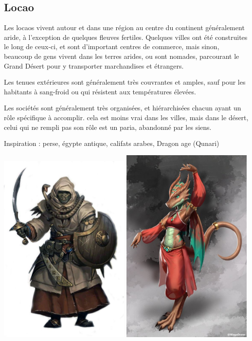\documentclass[10pt,a4paper]{book}
\begin{document}
\subsection{Locao}
Les locaos vivent autour et dans une région au centre du continent généralement aride, à l'exception de quelques fleuves fertiles. Quelques villes ont été construites le long de ceux-ci, et sont d'important centres de commerce, mais sinon, beaucoup de gens vivent dans les terres arides, ou sont nomades, parcourant le Grand Désert pour y transporter marchandises et étrangers.

Les tenues extérieures sont généralement très couvrantes et amples, sauf pour les habitants à sang-froid ou qui résistent aux températures élevées. 

Les sociétés sont généralement très organisées, et hiérarchisées chacun ayant un rôle spécifique à accomplir. cela est moins vrai dans les villes, mais dans le désert, celui qui ne rempli pas son rôle est un paria, abandonné par les siens.

Inspiration : perse, égypte antique, califats arabes, Dragon age (Qunari)

\includegraphics[width=0.49\textwidth]{orque 2}
\includegraphics[width=0.49\textwidth]{kobold 1}
\end{document}
